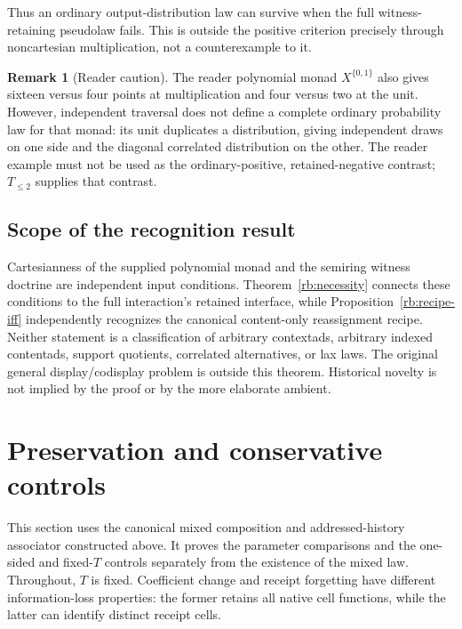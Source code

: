 \documentclass[11pt,a4paper]{article}
\theoremstyle{definition}
\newtheorem{remark}[theorem]{Remark}
\begin{document}
Thus an ordinary output-distribution law can survive when the full
witness-retaining pseudolaw fails. This is outside the positive criterion
precisely through noncartesian multiplication, not a counterexample to it.

\begin{remark}[Reader caution]\label{rb:reader}
The reader polynomial monad $X^{\{0,1\}}$ also gives sixteen versus four
points at multiplication and four versus two at the unit. However,
independent traversal does not define a complete ordinary probability law
for that monad: its unit duplicates a distribution, giving independent
draws on one side and the diagonal correlated distribution on the other.
The reader example must not be used as the ordinary-positive,
retained-negative contrast; $T_{\le2}$ supplies that contrast.
\end{remark}

\subsection{Scope of the recognition result}\label{rb:scope}

Cartesianness of the supplied polynomial monad and the semiring witness
doctrine are independent input conditions. Theorem~\ref{rb:necessity}
connects these conditions to the full interaction's retained interface,
while Proposition~\ref{rb:recipe-iff} independently recognizes the
canonical content-only reassignment recipe. Neither statement is a
classification of arbitrary contextads, arbitrary indexed contentads,
support quotients, correlated alternatives, or lax laws. The original
general display/codisplay problem is outside this theorem. Historical
novelty is not implied by the proof or by the more elaborate ambient.


\section{Preservation and conservative controls}\label{pc:section}

This section uses the canonical mixed composition and addressed-history
associator constructed above. It proves the parameter comparisons and the
one-sided and fixed-$T$ controls separately from the existence of the mixed
law. Throughout, $T$ is fixed. Coefficient change and receipt forgetting
have different information-loss properties: the former retains all native
cell functions, while the latter can identify distinct receipt cells.
\end{document}
